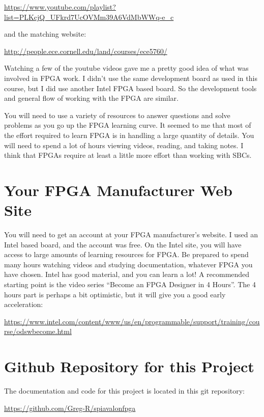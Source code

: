 \url{https://www.youtube.com/playlist?list=PLKcjQ_UFkrd7UcOVMm39A6VdMbWWq-e_c}

and the matching website:

\url{http://people.ece.cornell.edu/land/courses/ece5760/}

Watching a few of the youtube videos gave me a pretty good idea of what was involved in FPGA work.
I didn't use the same development board as used in this course, but I did use
another Intel FPGA based board.  So the development tools and general flow of working
with the FPGA are similar.

You will need to use a variety of resources to answer questions and solve problems as you go up the FPGA learning curve.
It seemed to me that most of the effort required to learn FPGA is in handling a large quantity of details.
You will need to spend a lot of hours viewing videos, reading, and taking notes.  I think that FPGAs require at least a little more effort than working with SBCs.

\section{Your FPGA Manufacturer Web Site}

You will need to get an account at your FPGA manufacturer's website.  I used an Intel based board, and the account was free.
On the Intel site, you will have access to large amounts of learning resources for FPGA.
Be prepared to spend many hours watching videos and studying documentation, whatever FPGA you have chosen.
Intel has good material, and you can learn a lot!  A recommended starting point is the video series ``Become an FPGA Designer in 4 Hours''.
The 4 hours part is perhaps a bit optimistic, but it will give you a good early acceleration:

\begin{footnotesize}
\url{https://www.intel.com/content/www/us/en/programmable/support/training/course/odswbecome.html}
\end{footnotesize}

\section{Github Repository for this Project}

The documentation and code for this project is located in this git repository:

\url{https://github.com/Greg-R/spiavalonfpga}